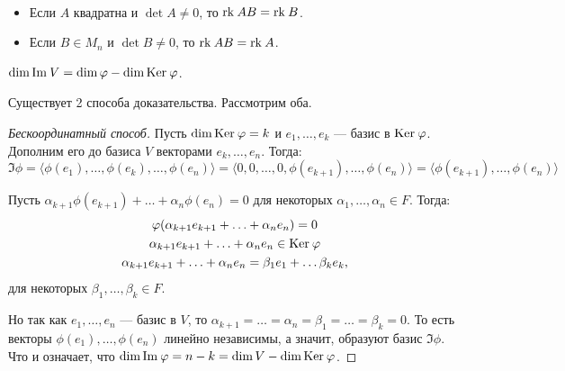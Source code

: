 \begin{Task}\
    \begin{itemize}
        \item Если $A$ квадратна и $\det A \neq 0$, то $\mathrm{rk}\: AB = \mathrm{rk}\: B$.
        \item Если $B \in M_n$ и $\det B \neq 0$, то $\mathrm{rk}\: AB = \mathrm{rk}\: A$.
    \end{itemize}
\end{Task}

\begin{Theorem}
    $\dim \mathrm{Im\:} V = \dim \varphi - \dim \mathrm{Ker}\: \varphi$.
\end{Theorem}

Существует 2 способа доказательства. Рассмотрим оба.

\begin{proof}[Бескоординатный способ]
     Пусть $\dim \mathrm{Ker}\: \varphi = k$ и $e_1, \ldots, e_k$ --- базис в $\mathrm{Ker}\: \varphi$. Дополним его до базиса $V$ векторами $e_k, \ldots, e_n$. Тогда:
    \[
        \Im \phi = \langle\phi(e_1), \ldots, \phi(e_k), \ldots, \phi(e_n)\rangle = \langle0, 0, \ldots, 0, \phi(e_{k+1}), \ldots, \phi(e_n)\rangle = \langle\phi(e_{k+1}), \ldots, \phi(e_{n})\rangle
    \]
    
Пусть $\alpha_{k+1}\phi(e_{k+1}) + \ldots + \alpha_n\phi(e_n) = 0$ для некоторых $\alpha_1, \ldots, \alpha_n \in F$. Тогда:
\begin{gather*}
    \varphi(\alpha_{k+1}e_{k+1} + \ldots + \alpha_ne_n) = 0 \\
    \alpha_{k+1}e_{k+1} + \ldots + \alpha_ne_n \in \mathrm{Ker}\: \varphi \\
    \alpha_{k+1}e_{k+1} + \ldots + \alpha_ne_n = \beta_1e_1 + \ldots \beta_ke_k,
\end{gather*}
для некоторых $\beta_1, \ldots, \beta_k \in F$.

Но так как $e_1, \ldots, e_n$ --- базис в $V$, то $\alpha_{k+1} =  \ldots = \alpha_n = \beta_1 = \ldots = \beta_k = 0$. То есть векторы $\phi(e_1), \ldots, \phi(e_n)$ линейно независимы, а значит, образуют базис $\Im \phi$. Что и означает, что $\dim\mathrm{Im\:}\varphi = n - k = \dim V - \dim\mathrm{Ker}\:\varphi$.
\end{proof}

